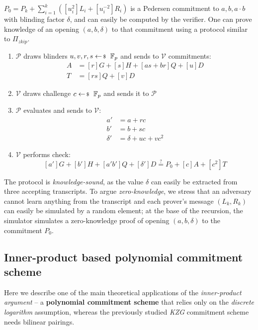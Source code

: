 \documentclass[../lecture-notes-148x210.tex]{subfiles}
\begin{document}
$P_0 = P_k + \sum_{i=1}^k ([u_i^2]L_i + [u_i^{-2}]R_i)$ is a Pedersen commitment to $a, b, a \cdot b$ with blinding factor $\delta$, and can easily be computed by the verifier. One can prove knowledge of an opening $(a,b,\delta)$ to that commitment using a protocol similar to $\Pi_{zkip}$.
\begin{enumerate}
    \item $\mathcal{P}$ draws blinders $u,v,r,s \leftarrowS \mathbb{F}_p$ and sends to $\mathcal{V}$ commitments:
    \begin{align*}
        A &= [r]G + [s]H + [as + br]Q + [u]D \\
        T &= [rs]Q + [v]D
    \end{align*}
    \item $\mathcal{V}$ draws challenge $c \leftarrowS \mathbb{F}_p$ and sends it to $\mathcal{P}$
    \item $\mathcal{P}$ evaluates and sends to $\mathcal{V}$:
    \begin{align*}
        a' &= a + rc \\
        b' &= b + sc \\
        \delta' &= \delta + uc + vc^2
    \end{align*}
    \item $\mathcal{V}$ performs check:
    $$[a']G + [b']H + [a'b']Q + [\delta']D \stackrel{\text{?}}{=} P_0 + [c]A + [c^2]T$$
\end{enumerate}

The protocol is \textit{knowledge-sound}, as the value $\delta$ can easily be extracted from three accepting transcripts. To argue \textit{zero-knowledge}, we stress that an adversary cannot learn anything from the transcript and each prover's message $(L_k, R_k)$ can easily be simulated by a random element; at the base of the recursion, the simulator simulates a zero-knowledge proof of opening $(a,b,\delta)$ to the commitment $P_0$.
\subsection{Inner-product based polynomial commitment scheme}

Here we describe one of the main theoretical applications of the \textit{inner-product argument} -- a \textbf{polynomial commitment scheme} that relies only on the \textit{discrete logarithm} assumption, whereas the previously studied \textit{KZG} commitment scheme needs bilinear pairings.
\end{document}
